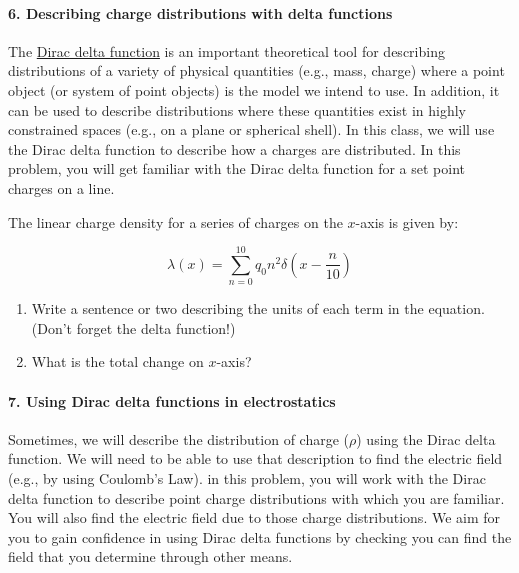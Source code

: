 \documentclass[11pt]{article}
\def\tightlist{}
\begin{document}
\paragraph{6. Describing charge distributions with delta
functions}\label{describing-charge-distributions-with-delta-functions}

The \href{https://en.wikipedia.org/wiki/Dirac_delta_function}{Dirac
delta function} is an important theoretical tool for describing
distributions of a variety of physical quantities (e.g., mass, charge)
where a point object (or system of point objects) is the model we intend
to use. In addition, it can be used to describe distributions where
these quantities exist in highly constrained spaces (e.g., on a plane or
spherical shell). In this class, we will use the Dirac delta function to
describe how a charges are distributed. In this problem, you will get
familiar with the Dirac delta function for a set point charges on a
line.

The linear charge density for a series of charges on the \(x\)-axis is
given by:

\[\lambda(x) = \sum_{n=0}^{10} q_0 n^2\delta\left(x-\dfrac{n}{10}\right)\]

\begin{enumerate}
\def\labelenumi{\arabic{enumi}.}
\tightlist
\item
  Write a sentence or two describing the units of each term in the
  equation. (Don't forget the delta function!)
\item
  What is the total change on \(x\)-axis?
\end{enumerate}

\paragraph{7. Using Dirac delta functions in
electrostatics}\label{using-dirac-delta-functions-in-electrostatics}

Sometimes, we will describe the distribution of charge (\(\rho\)) using
the Dirac delta function. We will need to be able to use that
description to find the electric field (e.g., by using Coulomb's Law).
in this problem, you will work with the Dirac delta function to describe
point charge distributions with which you are familiar. You will also
find the electric field due to those charge distributions. We aim for
you to gain confidence in using Dirac delta functions by checking you
can find the field that you determine through other means.
\end{document}
